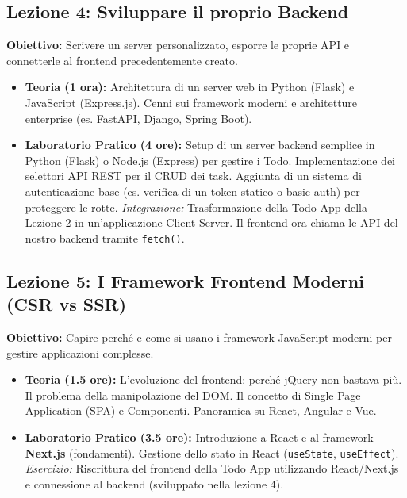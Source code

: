 \documentclass[11pt,a4paper]{article}
\begin{document}
\subsection*{Lezione 4: Sviluppare il proprio Backend}
\textbf{Obiettivo:} Scrivere un server personalizzato, esporre le proprie API e connetterle al frontend precedentemente creato.
\begin{itemize}
    \item \textbf{Teoria (1 ora):} Architettura di un server web in Python (Flask) e JavaScript (Express.js). Cenni sui framework moderni e architetture enterprise (es. FastAPI, Django, Spring Boot).
    \item \textbf{Laboratorio Pratico (4 ore):} Setup di un server backend semplice in Python (Flask) o Node.js (Express) per gestire i Todo. Implementazione dei selettori API REST per il CRUD dei task. Aggiunta di un sistema di autenticazione base (es. verifica di un token statico o basic auth) per proteggere le rotte. \textit{Integrazione:} Trasformazione della Todo App della Lezione 2 in un'applicazione Client-Server. Il frontend ora chiama le API del nostro backend tramite \texttt{fetch()}.
\end{itemize}

\subsection*{Lezione 5: I Framework Frontend Moderni (CSR vs SSR)}
\textbf{Obiettivo:} Capire perché e come si usano i framework JavaScript moderni per gestire applicazioni complesse.
\begin{itemize}
    \item \textbf{Teoria (1.5 ore):} L'evoluzione del frontend: perché jQuery non bastava più. Il problema della manipolazione del DOM. Il concetto di Single Page Application (SPA) e Componenti. Panoramica su React, Angular e Vue.
    \item \textbf{Laboratorio Pratico (3.5 ore):} Introduzione a React e al framework \textbf{Next.js} (fondamenti). Gestione dello stato in React (\texttt{useState}, \texttt{useEffect}). \textit{Esercizio:} Riscrittura del frontend della Todo App utilizzando React/Next.js e connessione al backend (sviluppato nella lezione 4).
\end{itemize}
\end{document}
